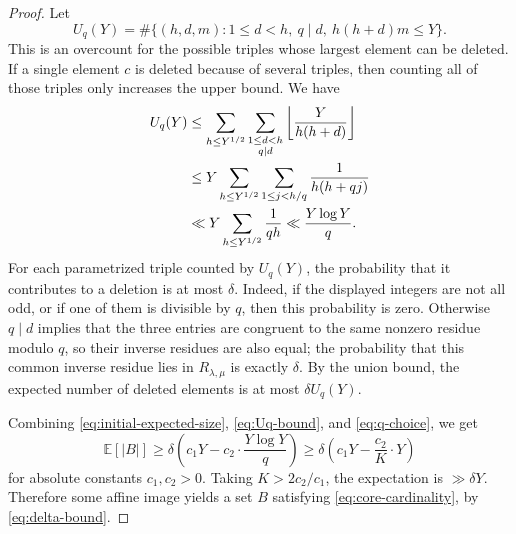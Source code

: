 \documentclass[10pt,a4paper]{amsart}
\begin{document}
\begin{proof}
Let
\[
  U_q(Y)=
  \#\{(h,d,m):1\le d<h,\ q\mid d,\ h(h+d)m\le Y\}.
\]
This is an overcount for the possible triples whose largest element can be deleted.  If a single element $c$ is deleted because of several triples, then counting all of those triples only increases the upper bound.  We have
\begin{align}
  U_q(Y)
  &\le
  \sum_{h\le Y^{1/2}}
  \sum_{\substack{1\le d<h\\ q\mid d}}
  \left\lfloor \frac{Y}{h(h+d)}\right\rfloor \notag\\
  &\le
  Y\sum_{h\le Y^{1/2}}
  \sum_{1\le j<h/q}
  \frac1{h(h+qj)} \notag\\
  &\ll
  Y\sum_{h\le Y^{1/2}}\frac1{qh}
  \ll \frac{Y\log Y}{q}.\label{eq:Uq-bound}
\end{align}
For each parametrized triple counted by $U_q(Y)$, the probability that it contributes to a deletion is at most $\delta$.  Indeed, if the displayed integers are not all odd, or if one of them is divisible by $q$, then this probability is zero.  Otherwise $q\mid d$ implies that the three entries are congruent to the same nonzero residue modulo $q$, so their inverse residues are also equal; the probability that this common inverse residue lies in $R_{\lambda,\mu}$ is exactly $\delta$.  By the union bound, the expected number of deleted elements is at most $\delta U_q(Y)$.

Combining \eqref{eq:initial-expected-size}, \eqref{eq:Uq-bound}, and \eqref{eq:q-choice}, we get
\[
  \mathbb E\!\left[|B|\right]
  \ge
  \delta\left(c_1Y-c_2\cdot\frac{Y\log Y}{q}\right)
  \ge
  \delta\left(c_1Y-\frac{c_2}{K}\cdot Y\right)
\]
for absolute constants $c_1,c_2>0$.  Taking $K>2c_2/c_1$, the expectation is $\gg \delta Y$.  Therefore some affine image yields a set $B$ satisfying \eqref{eq:core-cardinality}, by \eqref{eq:delta-bound}.
\end{proof}
\end{document}
